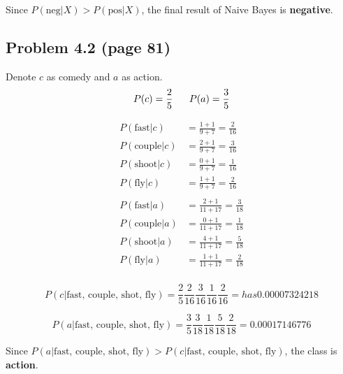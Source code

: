 Since $P(\text{neg}| X) > P(\text{pos}| X)$, the final result of Naive Bayes is \textbf{negative}.


\subsection{Problem 4.2 (page 81)}

Denote $c$ as comedy and $a$ as action.
$$P(c)=\frac{2}{5}\;\;\;\;\;\; P(a)=\frac{3}{5}\\$$

\begin{equation*}
\begin{aligned}
P(\text{fast}|c)&=\frac{1+1}{9+7} = \frac{2}{16}\\
P(\text{couple}|c)&=\frac{2+1}{9+7} = \frac{3}{16}\\
P(\text{shoot}|c)&=\frac{0+1}{9+7} = \frac{1}{16}\\
P(\text{fly}|c)&=\frac{1+1}{9+7} = \frac{2}{16}\\
\\
P(\text{fast}|a)&=\frac{2+1}{11+17} = \frac{3}{18}\\
P(\text{couple}|a)&=\frac{0+1}{11+17} = \frac{1}{18}\\
P(\text{shoot}|a)&=\frac{4+1}{11+17} = \frac{5}{18}\\
P(\text{fly}|a)&=\frac{1+1}{11+17} = \frac{2}{18}\\
\end{aligned}
\end{equation*}


$$P(c|\text{fast, couple, shot, fly}) = \frac{2}{5}\frac{2}{16}\frac{3}{16}\frac{1}{16}\frac{2}{16}=has 0.00007324218$$

$$P(a|\text{fast, couple, shot, fly}) = \frac{3}{5}\frac{3}{18}\frac{1}{18}\frac{5}{18}\frac{2}{18}=0.00017146776$$

Since $P(a|\text{fast, couple, shot, fly}) > P(c|\text{fast, couple, shot, fly})$, the class is \textbf{action}.




